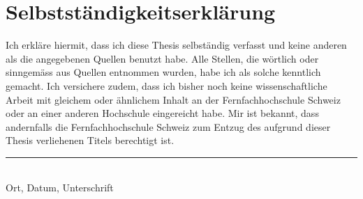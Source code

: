 \documentclass[main.tex]{subfiles}
\begin{document}
\chapter*{Selbstständigkeitserklärung}
Ich erkläre hiermit, dass ich diese Thesis selbständig verfasst und keine anderen als die angegebenen Quellen benutzt habe. Alle Stellen, die wörtlich oder sinngemäss aus Quellen entnommen wurden, habe ich als solche kenntlich gemacht. Ich versichere zudem, dass ich bisher noch keine wissenschaftliche Arbeit mit gleichem oder ähnlichem Inhalt an der Fernfachhochschule Schweiz oder an einer anderen Hochschule eingereicht habe. Mir ist bekannt, dass andernfalls die Fernfachhochschule Schweiz zum Entzug des aufgrund dieser Thesis verliehenen Titels berechtigt ist.

\vspace{4cm}
\noindent
\hrule \ \\[-0.5ex]
Ort, Datum, Unterschrift
\end{document}
